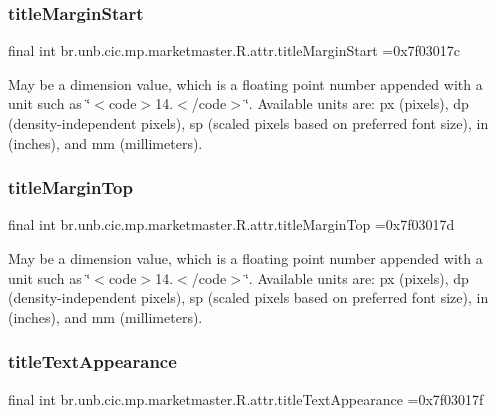 \subsubsection{\texorpdfstring{title\+Margin\+Start}{titleMarginStart}}
{\footnotesize\ttfamily final int br.\+unb.\+cic.\+mp.\+marketmaster.\+R.\+attr.\+title\+Margin\+Start =0x7f03017c\hspace{0.3cm}{\ttfamily [static]}}

May be a dimension value, which is a floating point number appended with a unit such as \char`\"{}$<$code$>$14.\+5sp$<$/code$>$\char`\"{}. Available units are\+: px (pixels), dp (density-\/independent pixels), sp (scaled pixels based on preferred font size), in (inches), and mm (millimeters). \mbox{\label{classbr_1_1unb_1_1cic_1_1mp_1_1marketmaster_1_1R_1_1attr_a0fe9a45d12de8315bebca8482a15fcbc}} 
\subsubsection{\texorpdfstring{title\+Margin\+Top}{titleMarginTop}}
{\footnotesize\ttfamily final int br.\+unb.\+cic.\+mp.\+marketmaster.\+R.\+attr.\+title\+Margin\+Top =0x7f03017d\hspace{0.3cm}{\ttfamily [static]}}

May be a dimension value, which is a floating point number appended with a unit such as \char`\"{}$<$code$>$14.\+5sp$<$/code$>$\char`\"{}. Available units are\+: px (pixels), dp (density-\/independent pixels), sp (scaled pixels based on preferred font size), in (inches), and mm (millimeters). \mbox{\label{classbr_1_1unb_1_1cic_1_1mp_1_1marketmaster_1_1R_1_1attr_ae11675c9705c6efc099dba56b6f0845e}} 
\subsubsection{\texorpdfstring{title\+Text\+Appearance}{titleTextAppearance}}
{\footnotesize\ttfamily final int br.\+unb.\+cic.\+mp.\+marketmaster.\+R.\+attr.\+title\+Text\+Appearance =0x7f03017f\hspace{0.3cm}{\ttfamily [static]}}

